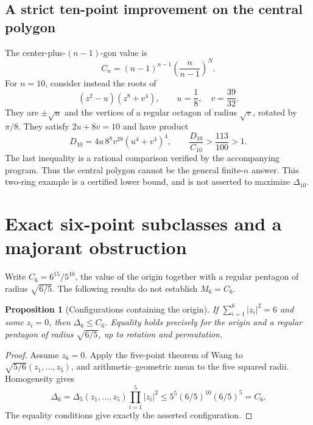 \documentclass[11pt]{article}
\newtheorem{proposition}[theorem]{Proposition}
\theoremstyle{remark}
\numberwithin{equation}{section}
\begin{document}
\subsection{A strict ten-point improvement on the central polygon}
The center-plus-$(n-1)$-gon value is
\[
 C_n=(n-1)^{n-1}\left(\frac n{n-1}\right)^N.
\]
For $n=10$, consider instead the roots of
\begin{equation}\label{eq:ten-polynomial}
 (z^2-u)(z^8+v^4),\qquad u=\frac18,\quad v=\frac{39}{32}.
\end{equation}
They are $\pm\sqrt u$ and the vertices of a regular octagon of
radius $\sqrt v$, rotated by $\pi/8$.
They satisfy $2u+8v=10$ and have product
\begin{equation}\label{eq:ten-product}
 D_{10}=4u\,8^8v^{28}(u^4+v^4)^4,\qquad
 \frac{D_{10}}{C_{10}}>\frac{113}{100}>1.
\end{equation}
The last inequality is a rational comparison verified by the
accompanying program. Thus the central polygon cannot be the general
finite-$n$ answer. This two-ring example is a certified lower bound,
and is not asserted to maximize $\Delta_{10}$.

\section{Exact six-point subclasses and a majorant obstruction}
Write $C_6=6^{15}/5^{10}$, the value of the origin together with a
regular pentagon of radius $\sqrt{6/5}$. The following results do
not establish $M_6=C_6$.

\begin{proposition}[Configurations containing the origin]
If $\sum_{i=1}^6|z_i|^2=6$ and some $z_i=0$, then $\Delta_6\le C_6$.
Equality holds precisely for the origin and a regular pentagon of
radius $\sqrt{6/5}$, up to rotation and permutation.
\end{proposition}
\begin{proof}
Assume $z_6=0$. Apply the five-point theorem of Wang \cite{Wang} to
$\sqrt{5/6}(z_1,\ldots,z_5)$, and arithmetic--geometric mean to
the five squared radii. Homogeneity gives
\[
 \Delta_6=\Delta_5(z_1,\ldots,z_5)\prod_{i=1}^5|z_i|^2
 \le5^5(6/5)^{10}(6/5)^5=C_6.
\]
The equality conditions give exactly the asserted configuration.
\end{proof}
\end{document}

